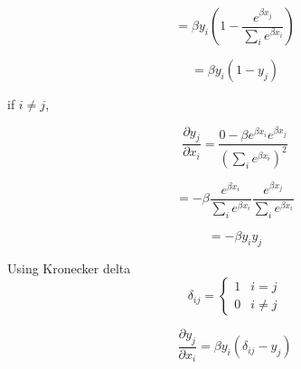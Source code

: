 \documentclass{article}
\begin{document}
\[
= \beta y_i ( 1- \frac{e^{\beta x_j}}{\sum_i e^{\beta x_i}})
\]

\[
= \beta y_i (1 - y_j)
\]

if $i\neq j$,

\[
\frac{\partial y_j}{\partial x_i} = \frac{0 - \beta e^{\beta x_i} e^{\beta x_j}}{(\sum_i e^{\beta x_i})^2}
\]

\[
= - \beta \frac{e^{\beta x_i}}{\sum_i e^{\beta x_i}} \frac{e^{\beta x_j}} {\sum_i e^{\beta x_i}}
\]

\[
= -\beta y_i y_j
\]

Using Kronecker delta 
\[
\delta_{ij} = \begin{cases}
  1 & i=j\\    
  0 & i \neq j
\end{cases} 
\]

\[
\frac{\partial y_j}{\partial x_i} = \beta y_i (\delta_{ij} - y_j)
\]
\end{document}
